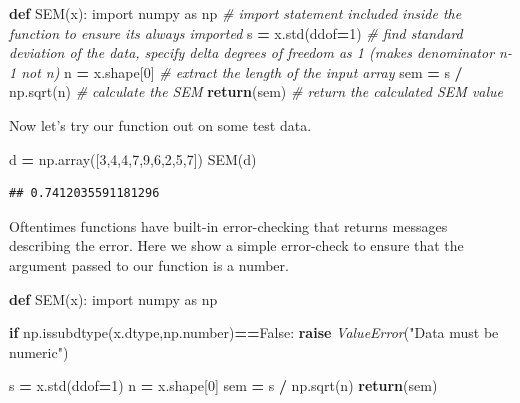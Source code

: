 \documentclass[
]{book}
\newenvironment{Shaded}{\begin{snugshade}}{\end{snugshade}}
\newcommand{\CommentTok}[1]{\textcolor[rgb]{0.56,0.35,0.01}{\textit{#1}}}
\newcommand{\ControlFlowTok}[1]{\textcolor[rgb]{0.13,0.29,0.53}{\textbf{#1}}}
\newcommand{\DecValTok}[1]{\textcolor[rgb]{0.00,0.00,0.81}{#1}}
\newcommand{\ImportTok}[1]{#1}
\newcommand{\KeywordTok}[1]{\textcolor[rgb]{0.13,0.29,0.53}{\textbf{#1}}}
\newcommand{\NormalTok}[1]{#1}
\newcommand{\OperatorTok}[1]{\textcolor[rgb]{0.81,0.36,0.00}{\textbf{#1}}}
\newcommand{\PreprocessorTok}[1]{\textcolor[rgb]{0.56,0.35,0.01}{\textit{#1}}}
\newcommand{\StringTok}[1]{\textcolor[rgb]{0.31,0.60,0.02}{#1}}
\newcommand{\VariableTok}[1]{\textcolor[rgb]{0.00,0.00,0.00}{#1}}
\begin{document}
\begin{Shaded}
\begin{Highlighting}[]
\KeywordTok{def}\NormalTok{ SEM(x):}
  \ImportTok{import}\NormalTok{ numpy }\ImportTok{as}\NormalTok{ np }\CommentTok{\# import statement included inside the function to ensure it\textquotesingle{}s always imported}
\NormalTok{  s }\OperatorTok{=}\NormalTok{ x.std(ddof}\OperatorTok{=}\DecValTok{1}\NormalTok{) }\CommentTok{\# find standard deviation of the data, specify delta degrees of freedom as 1 (makes denominator n{-}1 not n)}
\NormalTok{  n }\OperatorTok{=}\NormalTok{ x.shape[}\DecValTok{0}\NormalTok{] }\CommentTok{\# extract the length of the input array}
\NormalTok{  sem }\OperatorTok{=}\NormalTok{ s }\OperatorTok{/}\NormalTok{ np.sqrt(n) }\CommentTok{\# calculate the SEM}
  \ControlFlowTok{return}\NormalTok{(sem) }\CommentTok{\# return the calculated SEM value}
\end{Highlighting}
\end{Shaded}

Now let's try our function out on some test data.

\begin{Shaded}
\begin{Highlighting}[]
\NormalTok{d }\OperatorTok{=}\NormalTok{ np.array([}\DecValTok{3}\NormalTok{,}\DecValTok{4}\NormalTok{,}\DecValTok{4}\NormalTok{,}\DecValTok{7}\NormalTok{,}\DecValTok{9}\NormalTok{,}\DecValTok{6}\NormalTok{,}\DecValTok{2}\NormalTok{,}\DecValTok{5}\NormalTok{,}\DecValTok{7}\NormalTok{])}
\NormalTok{SEM(d)}
\end{Highlighting}
\end{Shaded}

\begin{verbatim}
## 0.7412035591181296
\end{verbatim}

Oftentimes functions have built-in error-checking that returns messages describing the error. Here we show a simple error-check to ensure that the argument passed to our function is a number.

\begin{Shaded}
\begin{Highlighting}[]
\KeywordTok{def}\NormalTok{ SEM(x):}
  \ImportTok{import}\NormalTok{ numpy }\ImportTok{as}\NormalTok{ np}
  
  \ControlFlowTok{if}\NormalTok{ np.issubdtype(x.dtype,np.number)}\OperatorTok{==}\VariableTok{False}\NormalTok{:}
    \ControlFlowTok{raise} \PreprocessorTok{ValueError}\NormalTok{(}\StringTok{"Data must be numeric"}\NormalTok{)}
  
\NormalTok{  s }\OperatorTok{=}\NormalTok{ x.std(ddof}\OperatorTok{=}\DecValTok{1}\NormalTok{) }
\NormalTok{  n }\OperatorTok{=}\NormalTok{ x.shape[}\DecValTok{0}\NormalTok{] }
\NormalTok{  sem }\OperatorTok{=}\NormalTok{ s }\OperatorTok{/}\NormalTok{ np.sqrt(n) }
  \ControlFlowTok{return}\NormalTok{(sem) }
\end{Highlighting}
\end{Shaded}
\end{document}
